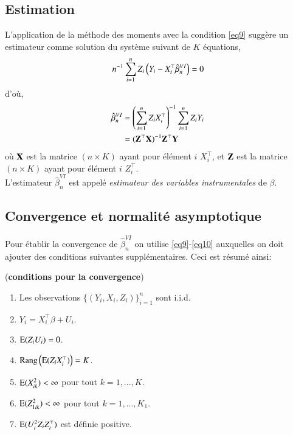  \subsection{Estimation}
L'application de la méthode des moments avec la condition \eqref{eq9} suggère un estimateur comme 
solution du système suivant de $K$ équations,
\begin{align*}
n^{-1}\sum_{i=1}^n Z_i\left(Y_i-X_i^\top\hat{\beta}^{VI}_n\right) = 0
\end{align*}
d'où,
\begin{align*}
\hat{\beta}^{VI}_n &= \left(\sum_{i=1}^n Z_iX_i^\top\right)^{-1}\sum_{i=1}^n Z_iY_i\\
&=(\mathbf Z^\top\mathbf X)^{-1}\mathbf Z^\top\mathbf Y
\end{align*}
où $\mathbf X$ est la matrice $(n\times K)$ ayant pour élément $i$ $X_i^\top$, et $\mathbf Z$ est la matrice $(n\times K)$ ayant pour élément $i$ $Z_i^\top$.\\
L'estimateur $\hat{\beta}^{VI}_n$ est appelé \emph{estimateur des variables instrumentales} de $\beta$.

\subsection{Convergence et normalité asymptotique}

Pour établir la convergence de $\hat{\beta}^{VI}_n$ on utilise \eqref{eq9}-\eqref{eq10} auxquelles on doit 
ajouter des conditions suivantes supplémentaires. Ceci est résumé ainsi:
\begin{condition}(\textbf{conditions pour la convergence})
\begin{enumerate}[label = (C1.\arabic*)]
\item Les observations $\{(Y_i, X_i, Z_i)\}_{i=1}^n$ sont i.i.d.
\item $Y_i = X_i^\top\beta + U_i$.
\item $\operatorname{E}(Z_iU_i) = 0$.
\item $\mathrm{Rang}\left(\operatorname{E}(Z_iX_i^\top)\right) = K$.
\item $\operatorname{E}(X_{ik}^2) < \infty$ pour tout $k=1,...,K$.
\item $\operatorname{E}(Z_{1ik}^2) < \infty$ pour tout $k=1,...,K_1$.
\item $\operatorname{E}(U_i^2Z_iZ_i^\top)$ est définie positive.
\end{enumerate}
\label{cond1}
\end{condition}

